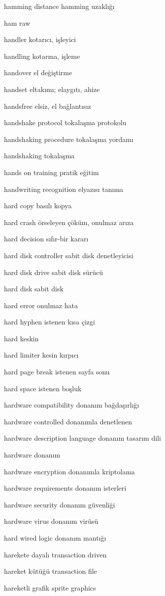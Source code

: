 \documentclass[12pt,fleqn]{article}\usepackage{../../common}
\begin{document}
hamming distance hamming uzaklığı

ham raw

handler kotarıcı, işleyici

handling kotarma, işleme

handover el değiştirme

handset eltakımı; elaygıtı, ahize

handsfree elsiz, el bağlantısız

handshake protocol tokalaşma protokolu

handshaking procedure tokalaşma yordamı

handshaking tokalaşma

hands on training pratik eğitim

handwriting recognition elyazısı tanıma

hard copy basılı kopya

hard crash örseleyen çöküm, onulmaz arıza

hard decision sıfır-bir kararı

hard disk controller sabit disk denetleyicisi

hard disk drive sabit disk sürücü

hard disk sabit disk

hard error onulmaz hata

hard hyphen istenen kısa çizgi

hard keskin

hard limiter kesin kırpıcı

hard page break istenen sayfa sonu

hard space istenen boşluk

hardware compatibility donanım bağdaşırlığı

hardware controlled donanımla denetlenen

hardware description language donanım tasarım dili

hardware donanım

hardware encryption donanımla kriptolama

hardware requirements donanım isterleri

hardware security donanım güvenliği

hardware virus donanım virüsü

hard wired logic donanım mantığı

harekete dayalı transaction driven

hareket kütüğü transaction file

hareketli grafik sprite graphics
\end{document}
